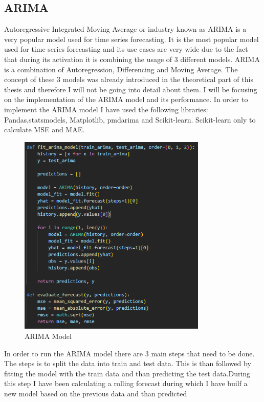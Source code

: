 \documentclass{imc-inf}
\begin{document}
		\subsection{ARIMA}
			Autoregressive Integrated Moving Average or industry known as ARIMA is a very popular model used for time series forecasting. It is the most popular model used for time series forecasting and its use cases are very wide due 
			to the fact that during its activation it is combining the usage of 3 different models. ARIMA is a combination of Autoregression, Differencing and Moving Average. The concept of these 3 models was already 
			introduced in the theoretical part of this thesis and therefore I will not be going into detail about them. I will be focusing on the implementation of the ARIMA model and its performance.
			In order to implement the ARIMA model I have used the following libraries: Pandas,statsmodels, Matplotlib, pmdarima and Scikit-learn. Scikit-learn only to calculate MSE and MAE.
			\begin{figure}
				\centering
				\includegraphics[width=0.8\textwidth]{arima_code.png}
				\caption{ARIMA Model}
				\label{fig:arima_model}		
			\end{figure}
			In order to run the ARIMA model there are 3 main steps that need to be done. The steps is to split the data into train and test data. This is than followed by fitting the model with the train data
			and than predicting the test data.During this step I have been calculating a rolling forecast during which I have builf a new model based on the previous data and than predicted 
\end{document}

